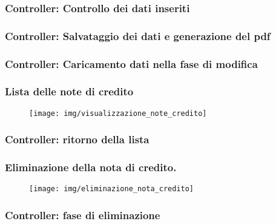 \documentclass[]{beamer}
\begin{document}
    \begin{frame}
        \frametitle{Controller: Controllo dei dati inseriti}
        
    \end{frame}

    \begin{frame}
        \frametitle{Controller: Salvataggio dei dati e generazione del pdf}
        
    \end{frame}

    \begin{frame}
        \frametitle{Controller: Caricamento dati nella fase di modifica}
        
    \end{frame}

    \begin{frame}
        \frametitle{Lista delle note di credito}
        \begin{figure}[H]
            \centering
            \texttt{[image: img/visualizzazione\_note\_credito]}\label{fig:visualizzazione}
        \end{figure}
    \end{frame}

    \begin{frame}
        \frametitle{Controller: ritorno della lista}
        
    \end{frame}

    \begin{frame}
        \frametitle{Eliminazione della nota di credito.}
        \begin{figure}[H]
            \centering
            \texttt{[image: img/eliminazione\_nota\_credito]}\label{fig:eliminazione}
        \end{figure}
    \end{frame}

    \begin{frame}
        \frametitle{Controller: fase di eliminazione}
        
    \end{frame}
\end{document}
